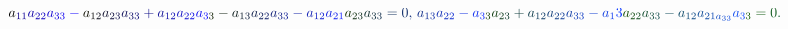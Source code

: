 \documentclass[12pt]{article}
\begin{document}
\begin{displaymath}
{a} _ { \mathcolor[RGB]{15,0,135}{1} \mathcolor[RGB]{15,0,150}{1} } \mathcolor[RGB]{15,0,165}{a} _ { \mathcolor[RGB]{15,0,180}{2} \mathcolor[RGB]{15,0,195}{2} } \mathcolor[RGB]{15,0,210}{a} _ { \mathcolor[RGB]{15,0,225}{3} \mathcolor[RGB]{15,0,240}{3} } \mathcolor[RGB]{15,0,255}{-} \mathcolor[RGB]{15,15,0}{a} _ { \mathcolor[RGB]{15,15,15}{1} \mathcolor[RGB]{15,15,30}{2} } \mathcolor[RGB]{15,15,45}{a} _ { \mathcolor[RGB]{15,15,60}{2} \mathcolor[RGB]{15,15,75}{3} } \mathcolor[RGB]{15,15,90}{a} _ { \mathcolor[RGB]{15,15,105}{3} \mathcolor[RGB]{15,15,120}{3} } \mathcolor[RGB]{15,15,135}{+} \mathcolor[RGB]{15,15,150}{a} _ { \mathcolor[RGB]{15,15,165}{1} \mathcolor[RGB]{15,15,180}{2} } \mathcolor[RGB]{15,15,195}{a} _ { \mathcolor[RGB]{15,15,210}{2} \mathcolor[RGB]{15,15,225}{2} } \mathcolor[RGB]{15,15,240}{a} _ { \mathcolor[RGB]{15,15,255}{3} \mathcolor[RGB]{15,30,0}{3} } \mathcolor[RGB]{15,30,15}{-} \mathcolor[RGB]{15,30,30}{a} _ { \mathcolor[RGB]{15,30,45}{1} \mathcolor[RGB]{15,30,60}{3} } \mathcolor[RGB]{15,30,75}{a} _ { \mathcolor[RGB]{15,30,90}{2} \mathcolor[RGB]{15,30,105}{2} } \mathcolor[RGB]{15,30,120}{a} _ { \mathcolor[RGB]{15,30,135}{3} \mathcolor[RGB]{15,30,150}{3} } \mathcolor[RGB]{15,30,165}{-} \mathcolor[RGB]{15,30,180}{a} _ { \mathcolor[RGB]{15,30,195}{1} \mathcolor[RGB]{15,30,210}{2} } \mathcolor[RGB]{15,30,225}{a} _ { \mathcolor[RGB]{15,30,240}{2} \mathcolor[RGB]{15,30,255}{1} } \mathcolor[RGB]{15,45,0}{a} _ { \mathcolor[RGB]{15,45,15}{2} \mathcolor[RGB]{15,45,30}{3} } \mathcolor[RGB]{15,45,45}{a} _ { \mathcolor[RGB]{15,45,60}{3} \mathcolor[RGB]{15,45,75}{3} } \mathcolor[RGB]{15,45,90}{=} \mathcolor[RGB]{15,45,105}{0} \mathcolor[RGB]{15,45,120}{,} \mathcolor[RGB]{15,45,135}{\,
a} _ { \mathcolor[RGB]{15,45,150}{1} \mathcolor[RGB]{15,45,165}{3} } \mathcolor[RGB]{15,45,180}{a} _ { \mathcolor[RGB]{15,45,195}{2} \mathcolor[RGB]{15,45,210}{2} } \mathcolor[RGB]{15,45,225}{-} \mathcolor[RGB]{15,45,240}{a} _ { \mathcolor[RGB]{15,45,255}{3} \mathcolor[RGB]{15,60,0}{3} } \mathcolor[RGB]{15,60,15}{a} _ { \mathcolor[RGB]{15,60,30}{2} \mathcolor[RGB]{15,60,45}{3} } \mathcolor[RGB]{15,60,60}{+} \mathcolor[RGB]{15,60,75}{a} _ { \mathcolor[RGB]{15,60,90}{1} \mathcolor[RGB]{15,60,105}{2} } \mathcolor[RGB]{15,60,120}{a} _ { \mathcolor[RGB]{15,60,135}{2} \mathcolor[RGB]{15,60,150}{2} } \mathcolor[RGB]{15,60,165}{a} _ { \mathcolor[RGB]{15,60,180}{3} \mathcolor[RGB]{15,60,195}{3} } \mathcolor[RGB]{15,60,210}{-} \mathcolor[RGB]{15,60,225}{a} _ { \mathcolor[RGB]{15,60,240}{1} } \mathcolor[RGB]{15,60,255}{3} \mathcolor[RGB]{15,75,0}{a} _ { \mathcolor[RGB]{15,75,15}{2} \mathcolor[RGB]{15,75,30}{2} } \mathcolor[RGB]{15,75,45}{a} _ { \mathcolor[RGB]{15,75,60}{3} \mathcolor[RGB]{15,75,75}{3} } \mathcolor[RGB]{15,75,90}{-} \mathcolor[RGB]{15,75,105}{a} _ { \mathcolor[RGB]{15,75,120}{1} \mathcolor[RGB]{15,75,135}{2} } \mathcolor[RGB]{15,75,150}{a} _ { \mathcolor[RGB]{15,75,165}{2} \mathcolor[RGB]{15,75,180}{1} \mathcolor[RGB]{15,75,195}{a} _ { \mathcolor[RGB]{15,75,210}{3} \mathcolor[RGB]{15,75,225}{3} } } \mathcolor[RGB]{15,75,240}{a} _ { \mathcolor[RGB]{15,75,255}{3} \mathcolor[RGB]{15,90,0}{3} } \mathcolor[RGB]{15,90,15}{=} \mathcolor[RGB]{15,90,30}{0} \mathcolor[RGB]{15,90,45}{.} \,
\end{displaymath}
\end{document}

